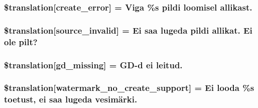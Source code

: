 \subsubsection[{\$translation}]{\setlength{\rightskip}{0pt plus 5cm}\$translation\mbox{[}\textquotesingle{}create\+\_\+error\textquotesingle{}\mbox{]} = \textquotesingle{}Viga \%s pildi loomisel allikast.\textquotesingle{}}\label{class_8upload_8et___e_e_8php_a53013ce9255c4e1849098ddd9fdb2b3f}
\hypertarget{class_8upload_8et___e_e_8php_a6ab0a660b457eaf2d3434b225449fdd6}{}
\subsubsection[{\$translation}]{\setlength{\rightskip}{0pt plus 5cm}\$translation\mbox{[}\textquotesingle{}source\+\_\+invalid\textquotesingle{}\mbox{]} = \textquotesingle{}Ei saa lugeda pildi allikat. Ei ole pilt?\textquotesingle{}}\label{class_8upload_8et___e_e_8php_a6ab0a660b457eaf2d3434b225449fdd6}
\hypertarget{class_8upload_8et___e_e_8php_a7f3dfcc0db4bbc0f2e7210c439798e56}{}
\subsubsection[{\$translation}]{\setlength{\rightskip}{0pt plus 5cm}\$translation\mbox{[}\textquotesingle{}gd\+\_\+missing\textquotesingle{}\mbox{]} = \textquotesingle{}G\+D-\/d ei leitud.\textquotesingle{}}\label{class_8upload_8et___e_e_8php_a7f3dfcc0db4bbc0f2e7210c439798e56}
\hypertarget{class_8upload_8et___e_e_8php_a82d5853430ab72dc1f9799ec36144cc6}{}
\subsubsection[{\$translation}]{\setlength{\rightskip}{0pt plus 5cm}\$translation\mbox{[}\textquotesingle{}watermark\+\_\+no\+\_\+create\+\_\+support\textquotesingle{}\mbox{]} = \textquotesingle{}Ei looda \%s toetust, ei saa lugeda vesimärki.\textquotesingle{}}\label{class_8upload_8et___e_e_8php_a82d5853430ab72dc1f9799ec36144cc6}
\hypertarget{class_8upload_8et___e_e_8php_aabca0b65dadbc6184415c16375f284ca}{}
